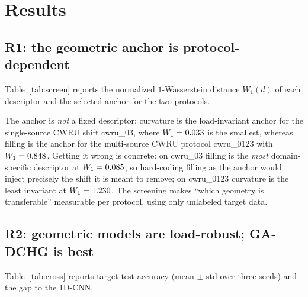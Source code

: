 \section{Results}
\label{sec:results}

\subsection{R1: the geometric anchor is protocol-dependent}
\label{sec:r1}

Table~\ref{tab:screen} reports the normalized $1$-Wasserstein distance
$W_1(d)$ of each descriptor and the selected anchor for the two protocols.

\begin{table}[t]
  \centering
  \small
  \caption{Component 1: normalized source--target distance $W_1(d)$ of each
  edge-geometry descriptor and the data-selected geometric anchor.}
  \label{tab:screen}
  
\end{table}

The anchor is \emph{not} a fixed descriptor: curvature is the load-invariant
anchor for the single-source CWRU shift cwru\_03, where
$W_1=0.033$ is the smallest, whereas filling is the anchor
for the multi-source CWRU protocol cwru\_0123 with
$W_1=0.848$. Getting it wrong is concrete: on cwru\_03
filling is the \emph{most} domain-specific descriptor at
$W_1=0.085$, so hard-coding filling as the anchor would inject
precisely the shift it is meant to remove; on cwru\_0123 curvature is the least
invariant at $W_1=1.230$. The screening makes ``which
geometry is transferable'' measurable per protocol, using only unlabeled target
data.

\subsection{R2: geometric models are load-robust; GA-DCHG is best}
\label{sec:r2}

Table~\ref{tab:cross} reports target-test accuracy (mean $\pm$ std over three
seeds) and the gap to the 1D-CNN.

\begin{table}[t]
  \centering
  \small
  \caption{Cross-domain target-test accuracy (mean $\pm$ std over three seeds)
  and the gap to the 1D-CNN baseline (positive = above the CNN).}
  \label{tab:cross}
  
\end{table}

